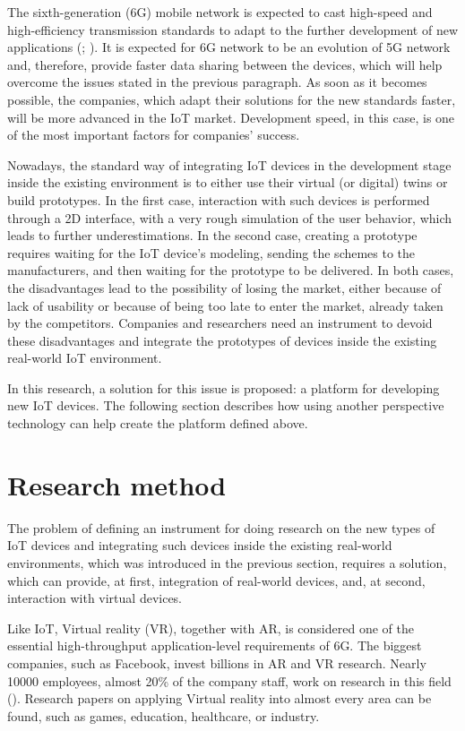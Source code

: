 The sixth-generation (6G) mobile network is expected to cast high-speed and high-efficiency transmission standards to adapt to the further development of new applications (\cite{liao_information-centric_2021}; \cite{huang_survey_2019}). It is expected for 6G network to be an evolution of 5G network and, therefore, provide faster data sharing between the devices, which will help overcome the issues stated in the previous paragraph. As soon as it becomes possible, the companies, which adapt their solutions for the new standards faster, will be more advanced in the IoT market. Development speed, in this case, is one of the most important factors for companies' success.

Nowadays, the standard way of integrating IoT devices in the development stage inside the existing environment is to either use their virtual (or digital) twins or build prototypes. In the first case, interaction with such devices is performed through a 2D interface, with a very rough simulation of the user behavior, which leads to further underestimations. In the second case, creating a prototype requires waiting for the IoT device's modeling, sending the schemes to the manufacturers, and then waiting for the prototype to be delivered. In both cases, the disadvantages lead to the possibility of losing the market, either because of lack of usability or because of being too late to enter the market, already taken by the competitors. Companies and researchers need an instrument to devoid these disadvantages and integrate the prototypes of devices inside the existing real-world IoT environment.

In this research, a solution for this issue is proposed: a platform for developing new IoT devices. The following section describes how using another perspective technology can help create the platform defined above.

\section{Research method}

The problem of defining an instrument for doing research on the new types of IoT devices and integrating such devices inside the existing real-world environments, which was introduced in the previous section, requires a solution, which can provide, at first, integration of real-world devices, and, at second, interaction with virtual devices.

Like IoT, Virtual reality (VR), together with AR, is considered one of the essential high-throughput application-level requirements of 6G. The biggest companies, such as Facebook, invest billions in AR and VR research. Nearly 10000 employees, almost 20\% of the company staff, work on research in this field (\cite{sam_byford_almost_2021}). Research papers on applying Virtual reality into almost every area can be found, such as games, education, healthcare, or industry.

